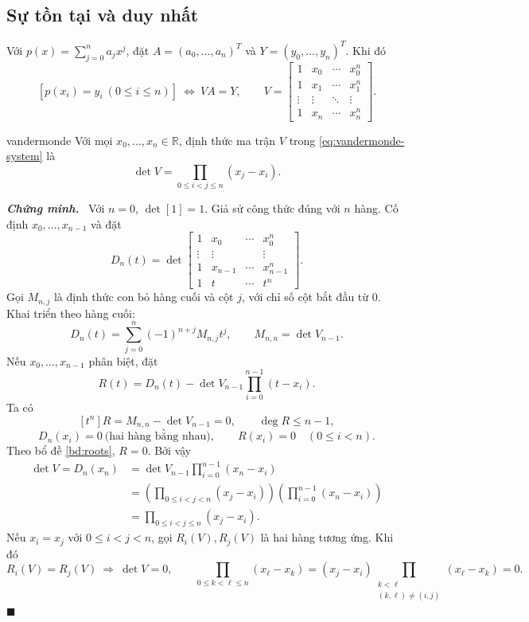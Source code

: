\documentclass[12pt,a4paper,oneside]{book}
\numberwithin{algorithm}{chapter}
\theoremstyle{definition}
\newenvironment{chungminh}{\par\medskip\noindent\textbf{\textit{\color{mainblue}Chứng minh.}}\ }{\hfill$\blacksquare$\par\medskip}
\newcommand{\R}{\mathbb{R}}
\begin{document}
\subsection{Sự tồn tại và duy nhất}
Với $p(x)=\sum_{j=0}^{n}a_jx^j$, đặt $A=(a_0,\ldots,a_n)^T$ và $Y=(y_0,\ldots,y_n)^T$. Khi đó
\begin{equation}\label{eq:vandermonde-system}
 \left[p(x_i)=y_i\ (0\leq i\leq n)\right]
 \ \Longleftrightarrow\ VA=Y,
 \qquad
 V=\begin{bmatrix}
 1&x_0&\cdots&x_0^n\\
 1&x_1&\cdots&x_1^n\\
 \vdots&\vdots&\ddots&\vdots\\
 1&x_n&\cdots&x_n^n
 \end{bmatrix}.
\end{equation}

\begin{dinhly}{}{vandermonde}
Với mọi $x_0,\ldots,x_n\in\R$, định thức ma trận $V$ trong \eqref{eq:vandermonde-system} là
\begin{equation}\label{eq:vandermonde-det}
 \det V=\prod_{0\leq i<j\leq n}(x_j-x_i).
\end{equation}
\end{dinhly}
\begin{chungminh}
Với $n=0$, $\det[1]=1$. Giả sử công thức đúng với $n$ hàng. Cố định $x_0,\ldots,x_{n-1}$ và đặt
\[
 D_n(t)=\det\begin{bmatrix}
 1&x_0&\cdots&x_0^n\\
 \vdots&\vdots&&\vdots\\
 1&x_{n-1}&\cdots&x_{n-1}^n\\
 1&t&\cdots&t^n
 \end{bmatrix}.
\]
Gọi $M_{n,j}$ là định thức con bỏ hàng cuối và cột $j$, với chỉ số cột bắt đầu từ $0$. Khai triển theo hàng cuối:
\[
 D_n(t)=\sum_{j=0}^{n}(-1)^{n+j}M_{n,j}t^j,
 \qquad M_{n,n}=\det V_{n-1}.
\]
Nếu $x_0,\ldots,x_{n-1}$ phân biệt, đặt
\[
 R(t)=D_n(t)-\det V_{n-1}\prod_{i=0}^{n-1}(t-x_i).
\]
Ta có
\[
 [t^n]R=M_{n,n}-\det V_{n-1}=0,\qquad\deg R\leq n-1,
\]
\[
 D_n(x_i)=0\ \text{(hai hàng bằng nhau)},\qquad
 R(x_i)=0\quad(0\leq i<n).
\]
Theo bổ đề \ref{bd:roots}, $R=0$. Bởi vậy
\begin{align*}
 \det V=D_n(x_n)
 &=\det V_{n-1}\prod_{i=0}^{n-1}(x_n-x_i)\\
 &=\left(\prod_{0\leq i<j<n}(x_j-x_i)\right)
   \left(\prod_{i=0}^{n-1}(x_n-x_i)\right)\\
 &=\prod_{0\leq i<j\leq n}(x_j-x_i).
\end{align*}
Nếu $x_i=x_j$ với $0\leq i<j<n$, gọi $R_i(V),R_j(V)$ là hai hàng tương ứng. Khi đó
\[
 R_i(V)=R_j(V)\ \Longrightarrow\ \det V=0,
 \qquad
 \prod_{0\leq k<\ell\leq n}(x_\ell-x_k)
 =(x_j-x_i)\prod_{\substack{k<\ell\\(k,\ell)\ne(i,j)}}(x_\ell-x_k)=0.
\]
\end{chungminh}
\end{document}
